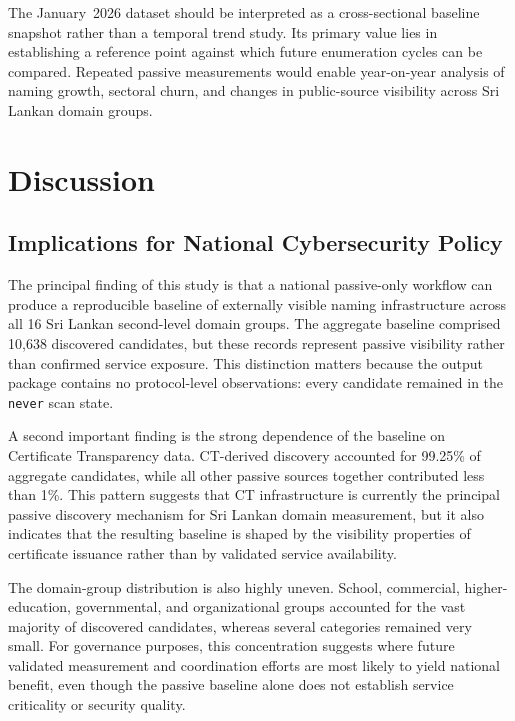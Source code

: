 \documentclass[preprint,review,12pt]{elsarticle}
\begin{document}
The January~2026 dataset should be interpreted as a cross-sectional baseline snapshot rather than a temporal trend study. Its primary value lies in establishing a reference point against which future enumeration cycles can be compared. Repeated passive measurements would enable year-on-year analysis of naming growth, sectoral churn, and changes in public-source visibility across Sri Lankan domain groups.

\section{Discussion}
\label{sec:discussion}

\subsection{Implications for National Cybersecurity Policy}

The principal finding of this study is that a national passive-only workflow can produce a reproducible baseline of externally visible naming infrastructure across all 16 Sri Lankan second-level domain groups. The aggregate baseline comprised 10,638 discovered candidates, but these records represent passive visibility rather than confirmed service exposure. This distinction matters because the output package contains no protocol-level observations: every candidate remained in the \texttt{never} scan state.

A second important finding is the strong dependence of the baseline on Certificate Transparency data. CT-derived discovery accounted for 99.25\% of aggregate candidates, while all other passive sources together contributed less than 1\%. This pattern suggests that CT infrastructure is currently the principal passive discovery mechanism for Sri Lankan domain measurement, but it also indicates that the resulting baseline is shaped by the visibility properties of certificate issuance rather than by validated service availability.

The domain-group distribution is also highly uneven. School, commercial, higher-education, governmental, and organizational groups accounted for the vast majority of discovered candidates, whereas several categories remained very small. For governance purposes, this concentration suggests where future validated measurement and coordination efforts are most likely to yield national benefit, even though the passive baseline alone does not establish service criticality or security quality.
\end{document}
